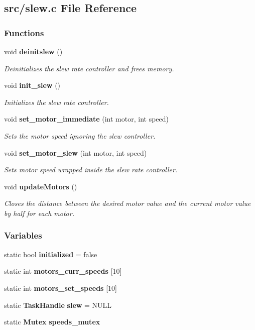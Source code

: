 \subsection{src/slew.c File Reference}
\label{slew_8c}
\subsubsection*{Functions}
\begin{DoxyCompactItemize}
\item 
void \textbf{ deinitslew} ()
\begin{DoxyCompactList}\small\item\em Deinitializes the slew rate controller and frees memory. \end{DoxyCompactList}\item 
void \textbf{ init\+\_\+slew} ()
\begin{DoxyCompactList}\small\item\em Initializes the slew rate controller. \end{DoxyCompactList}\item 
void \textbf{ set\+\_\+motor\+\_\+immediate} (int motor, int speed)
\begin{DoxyCompactList}\small\item\em Sets the motor speed ignoring the slew controller. \end{DoxyCompactList}\item 
void \textbf{ set\+\_\+motor\+\_\+slew} (int motor, int speed)
\begin{DoxyCompactList}\small\item\em Sets motor speed wrapped inside the slew rate controller. \end{DoxyCompactList}\item 
void \textbf{ update\+Motors} ()
\begin{DoxyCompactList}\small\item\em Closes the distance between the desired motor value and the current motor value by half for each motor. \end{DoxyCompactList}\end{DoxyCompactItemize}
\subsubsection*{Variables}
\begin{DoxyCompactItemize}
\item 
static bool \textbf{ initialized} = false
\item 
static int \textbf{ motors\+\_\+curr\+\_\+speeds} [10]
\item 
static int \textbf{ motors\+\_\+set\+\_\+speeds} [10]
\item 
static \textbf{ Task\+Handle} \textbf{ slew} = N\+U\+LL
\item 
static \textbf{ Mutex} \textbf{ speeds\+\_\+mutex}
\end{DoxyCompactItemize}


